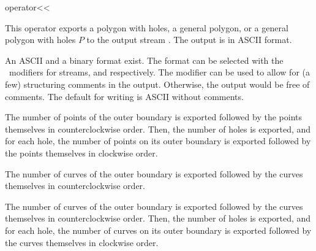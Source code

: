 
\ccHtmlNoClassLinks
\begin{ccRefFunction}{operator<<}
\label{refPolygon_with_holes_operator_leftshift}

\ccDefinition

This operator exports a polygon with holes, a general polygon, or a general 
polygon with holes $P$ to the output stream . The output is in ASCII
format.

An ASCII and a binary format exist. The format can be selected with
the \cgal\ modifiers for streams,  and
 respectively. The modifier 
can be used to allow for (a few) structuring comments in the
output. Otherwise, the output would be free of comments.  The default
for writing is ASCII without comments.


The number of points of the outer boundary is exported followed by the 
points themselves in counterclockwise order. Then, the number of holes is exported,
and for each hole, the number of points on its outer boundary is exported followed
by the points themselves in clockwise order.

The number of curves of the outer boundary is exported followed by the 
curves themselves in counterclockwise order.


The number of curves of the outer boundary is exported followed by the 
curves themselves in counterclockwise order. Then, the number of holes is exported,
and for each hole, the number of curves on its outer boundary is exported followed 
by the curves themselves in clockwise order.

\ccSeeAlso

\\ 
\\ 
\\ 

\end{ccRefFunction}
